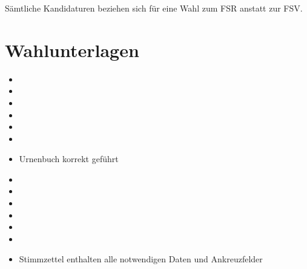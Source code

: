 \documentclass[a4paper]{scrartcl}
\newcommand{\fullcheck}{\raisebox{-.8\dp\strutbox}{\texttt{[image: Check.pdf]}}}
\newcommand{\semicheck}{\raisebox{-.8\dp\strutbox}{\texttt{[image: Semicheck.pdf]}}}
\newcommand{\nocheck}{\raisebox{-.8\dp\strutbox}{\texttt{[image: Nocheck.pdf]}}}
\newcommand{\dontknow}{\raisebox{-.8\dp\strutbox}{\texttt{[image: Dontknow.pdf]}}}
\newcommand{\notrev}{\raisebox{-.8\dp\strutbox}{\texttt{[image: Notrev.pdf]}}}
\newcommand{\sym}[1]{
\ifcase#1 \item[$\Box$]
\or \item[\fullcheck]
\or \item[\semicheck]
\or \item[\nocheck]
\or \item[\dontknow]
\or \item[\notrev]
\else \item[$\Box$]
\fi}
\begin{document}







Sämtliche Kandidaturen beziehen sich für eine Wahl zum FSR anstatt zur FSV.

\section{Wahlunterlagen}
\begin{itemize}[label=$\Box$]
\sym{1} Urnenbuch korrekt geführt
\sym{4} Stimmzettel enthalten alle notwendigen Daten und Ankreuzfelder
\end{itemize}




\end{document}
